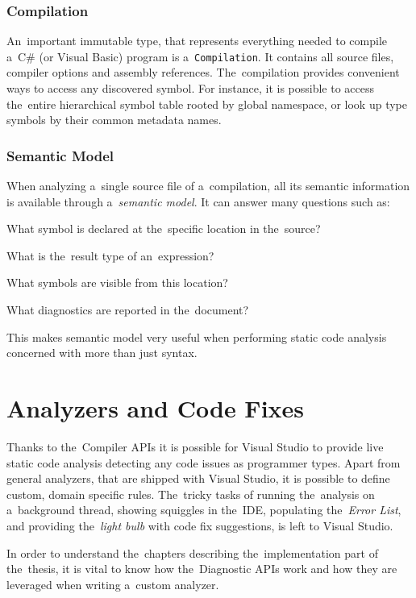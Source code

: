 \documentclass[
  digital, %
  table,   %
  lof,     %
  lot,     %
  oneside,
]{fithesis3}
\begin{document}
\subsubsection{\textbf{Compilation}}
An~important immutable type, that represents everything needed to compile a~C\# (or Visual Basic) program is a~\texttt{Compilation}. It contains all source files, compiler options and assembly references. The~compilation provides convenient ways to access any discovered symbol. For instance, it is possible to access the~entire hierarchical symbol table rooted by global namespace, or look up type symbols by their common metadata names.

\subsubsection{\textbf{Semantic Model}}
When analyzing a~single source file of a~compilation, all its semantic information is available through a~\textit{semantic model}. It can answer many questions such as:
  \begin{compactitem}
  \item What symbol is declared at the~specific location in the~source?
  \item What is the~result type of an~expression?
  \item What symbols are visible from this location?
  \item What diagnostics are reported in the~document?
  \end{compactitem}
 
This makes semantic model very useful when performing static code analysis concerned with more than just syntax.
 
\section{Analyzers and Code Fixes}
\label{sec:analyzers-and-code-fixes}
Thanks to the~Compiler APIs it is possible for Visual Studio to provide live static code analysis detecting any code issues as programmer types. Apart from general analyzers, that are shipped with Visual Studio, it is possible to define custom, domain specific rules. The~tricky tasks of running the~analysis on a~background thread, showing squiggles in the~IDE, populating the~\textit{Error List}, and providing the~\textit{light bulb} with code fix suggestions, is left to Visual Studio.

In order to understand the~chapters describing the~implementation part of the~thesis, it is vital to know how the~Diagnostic APIs work and how they are leveraged when writing a~custom analyzer.
\end{document}
